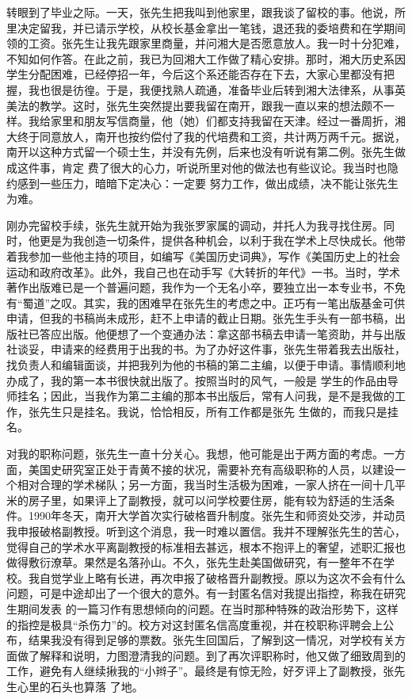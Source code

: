 \documentclass{article}
\begin{document}
转眼到了毕业之际。一天，张先生把我叫到他家里，跟我谈了留校的事。他说，所里决定留我，并已请示学校，从校长基金拿出一笔钱，退还我的委培费和在学期间领的工资。张先生让我先跟家里商量，并问湘大是否愿意放人。我一时十分犯难，不知如何作答。在此之前，我已为回湘大工作做了精心安排。那时，湘大历史系因学生分配困难，已经停招一年，今后这个系还能否存在下去，大家心里都没有把握，我也很是彷徨。于是，我便找熟人疏通，准备毕业后转到湘大法律系，从事英美法的教学。这时，张先生突然提出要我留在南开，跟我一直以来的想法颇不一样。我给家里和朋友写信商量，他（她）们都支持我留在天津。经过一番周折，湘大终于同意放人，南开也按约偿付了我的代培费和工资，共计两万两千元。据说，南开以这种方式留一个硕士生，并没有先例，后来也没有听说有第二例。张先生做成这件事，肯定
\newpage
费了很大的心力，听说所里对他的做法也有些议论。我当时也隐约感到一些压力，暗暗下定决心：一定要
努力工作，做出成绩，决不能让张先生为难。 

刚办完留校手续，张先生就开始为我张罗家属的调动，并托人为我寻找住房。同时，他更是为我创造一切条件，提供各种机会，以利于我在学术上尽快成长。他带着我参加一些他主持的项目，如编写《美国历史词典》，写作《美国历史上的社会运动和政府改革》。此外，我自己也在动手写《大转折的年代》一书。当时，学术著作出版难已是一个普遍问题，我作为一个无名小卒，要独立出一本专业书，不免有“蜀道”之叹。其实，我的困难早在张先生的考虑之中。正巧有一笔出版基金可供申请，但我的书稿尚未成形，赶不上申请的截止日期。张先生手头有一部书稿，出版社已答应出版。他便想了一个变通办法：拿这部书稿去申请一笔资助，并与出版社谈妥，申请来的经费用于出我的书。为了办好这件事，张先生带着我去出版社，找负责人和编辑面谈，并把我列为他的书稿的第二主编，以便于申请。事情顺利地办成了，我的第一本书很快就出版了。按照当时的风气，一般是
\newpage
学生的作品由导师挂名；因此，当我作为第二主编的那本书出版后，常有人问我，是不是我做的工作，张先生只是挂名。我说，恰恰相反，所有工作都是张先
生做的，而我只是挂名。 

对我的职称问题，张先生一直十分关心。我想，他可能是出于两方面的考虑。一方面，美国史研究室正处于青黄不接的状况，需要补充有高级职称的人员，以建设一个相对合理的学术梯队；另一方面，我当时生活极为困难，一家人挤在一间十几平米的房子里，如果评上了副教授，就可以问学校要住房，能有较为舒适的生活条件。1990年冬天，南开大学首次实行破格晋升制度。张先生和师资处交涉，并动员我申报破格副教授。听到这个消息，我一时难以置信。我并不理解张先生的苦心，觉得自己的学术水平离副教授的标准相去甚远，根本不抱评上的奢望，述职汇报也做得敷衍潦草。果然是名落孙山。不久，张先生赴美国做研究，有一整年不在学校。我自觉学业上略有长进，再次申报了破格晋升副教授。原以为这次不会有什么问题，可是中途却出了一个很大的意外。有一封匿名信对我提出指控，称我在研究生期间发表
\newpage
的一篇习作有思想倾向的问题。在当时那种特殊的政治形势下，这样的指控是极具“杀伤力”的。校方对这封匿名信高度重视，并在校职称评聘会上公布，结果我没有得到足够的票数。张先生回国后，了解到这一情况，对学校有关方面做了解释和说明，力图澄清我的问题。到了再次评职称时，他又做了细致周到的工作，避免有人继续揪我的“小辫子”。最终是有惊无险，好歹评上了副教授，张先生心里的石头也算落
了地。 
\end{document}
